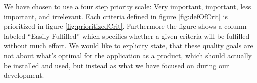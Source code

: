 We have chosen to use a four step priority scale: Very important, important, less important, and irrelevant.
Each criteria defined in figure \ref{fig:defOfCrit} is prioritized in figure \ref{fig:prioritizedCrit}. Furthermore the figure shows a column labeled ``Easily Fulfilled'' which specifies whether a given criteria will be fulfilled without much effort.
We would like to explicity state, that these quality goals are not about what's optimal for the application as a product, which should actually be installed and used, but instead as what we have focused on during our development.

